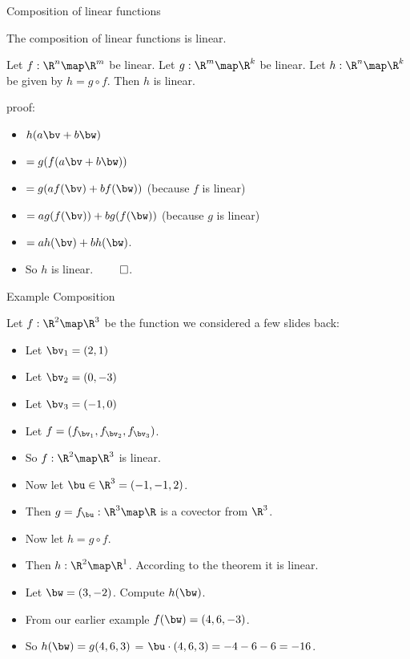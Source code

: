 \documentclass{beamer}
\begin{document}
\begin{frame}{Composition of linear functions}

The composition of linear functions is linear.

\pause

\begin{lemma}
Let $f:\R^n\map\R^m$ be linear. Let $g:\R^m\map\R^k$ be linear.
Let $h:\R^n\map\R^k$ be given by $h=g\circ f$.
\pause
Then $h$ is linear.
\end{lemma}

\pause

proof:

\begin{itemize}
\item $h(a\bv +b\bw)$
\item $= g(f(a\bv +b\bw))$
\item $= g(a f(\bv) + b f(\bw))$ \quad (because $f$ is linear)
\item $= a g(f(\bv)) + b g(f(\bw))$ \quad (because $g$ is linear)
\item $= a h(\bv) + b h(\bw)$.
\item So $h$ is linear. $\qed$.
\end{itemize}

\end{frame}

\begin{frame}{Example Composition}

Let $f:\R^2\map\R^3$ be the function we considered a few slides back:

\begin{itemize}
\item Let $\bv_1 = (2, 1)$
\item Let $\bv_2 = (0, -3)$
\item Let $\bv_3 = (-1, 0)$
\item Let $f = (f_{\bv_1},f_{\bv_2},f_{\bv_3})$.
\item So $f:\R^2\map\R^3$ is linear.
\item Now let $\bu\in\R^3 = (-1, -1, 2)$.
\item Then $g = f_{\bu}:\R^3\map\R$ is a covector from $\R^3$.
\item Now let $h=g\circ f$.
\item Then $h:\R^2\map\R^1$. According to the theorem it is linear.
\item Let $\bw = (3, -2)$. Compute $h(\bw)$.
\item From our earlier example $f(\bw) =(4, 6, -3)$.
\item So $h(\bw) = g(4, 6, 3)$ = $\bu\cdot(4,6,3) = -4 -6 -6 = -16$.
\end{itemize}

\end{frame}
\end{document}
